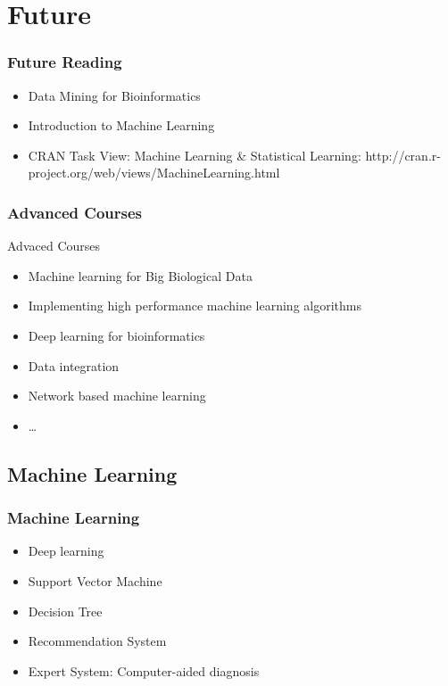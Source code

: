 \documentclass[UTF8]{beamer}\usepackage[]{graphicx}\usepackage[]{color}
\begin{document}
\section{Future}

\begin{frame}
  \frametitle{Future Reading}
\begin{itemize}
\item Data Mining for Bioinformatics
\item Introduction to Machine Learning
\item CRAN Task View: Machine Learning \& Statistical Learning: http://cran.r-project.org/web/views/MachineLearning.html
\end{itemize}
\end{frame}

\begin{frame}[fragile]
  \frametitle{Advanced Courses}
\begin{block}{Advaced Courses}
\begin{itemize}
\item Machine learning for Big Biological Data
\item Implementing high performance machine learning algorithms
\item Deep learning for bioinformatics
\item Data integration
\item Network based machine learning
\item \ldots
\end{itemize}
\end{block}
\end{frame}

\subsection{Machine Learning}
\begin{frame}
  \frametitle{Machine Learning}
  \begin{itemize}
    \item Deep learning
    \item Support Vector Machine
    \item Decision Tree
    \item Recommendation System
    \item Expert System: Computer-aided diagnosis
  \end{itemize}
\end{frame}
\end{document}
